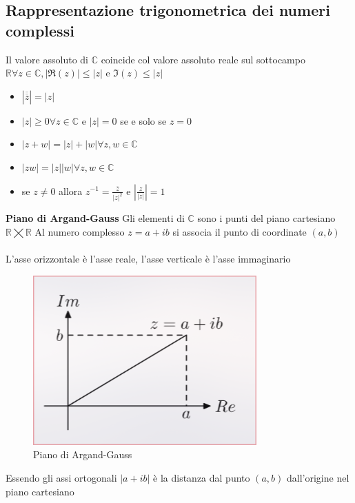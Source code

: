 \documentclass{report}
\begin{document}
\subsection{Rappresentazione trigonometrica dei numeri complessi}
Il valore assoluto di $\mathbb{C}$ coincide col valore assoluto reale sul sottocampo $\mathbb{R} \forall z \in \mathbb{C}, |\Re(z)| \leq |z|$ e $\Im(z) \leq |z|$ 
\begin{itemize}
    \item{$|\overline{\overline{z}}| = |z|$}
    \item{$|z| \geq 0 \forall z \in \mathbb{C}$ e $|z| = 0$ se e solo se $z = 0$}
    \item{$|z + w| = |z| + |w|  \forall z, w \in \mathbb{C}$}
    \item{$|zw| = |z| |w| \forall z, w \in \mathbb{C}$}
    \item{ se $z \neq 0$ allora $z^{-1} = \frac{\overline{z}}{|z|^2}$ e $|\frac{z}{|z|}| = 1$}
\end{itemize}
\textbf{Piano di Argand-Gauss}
Gli elementi di $\mathbb{C}$ sono i punti del piano cartesiano $\mathbb{R} \varprod \mathbb{R}$ Al numero complesso $z = a + ib$ si associa il punto di coordinate $(a, b)$ 
\\ \\
L'asse orizzontale è l'asse reale, l'asse verticale è l'asse immaginario 
\begin{figure}[h]
  \centering
  \includegraphics[scale=0.5]{img/pianoArgandGauss.png}
  \caption{Piano di Argand-Gauss}
  \label{fig:image}
\end{figure}
Essendo gli assi ortogonali $|a + ib|$ è la distanza dal punto $(a,b)$ dall'origine nel piano cartesiano
\end{document}
